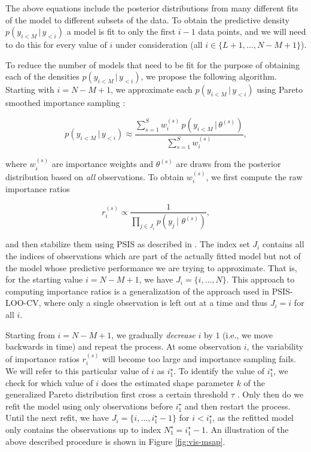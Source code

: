 \documentclass[american,]{article}
\begin{document}
The above equations include the posterior distributions from many
different fits of the model to different subsets of the data. To obtain
the predictive density \(p(y_{i<M} \,|\, y_{<i})\) a model is fit to
only the first \(i-1\) data points, and we will need to do this for every value of
\(i\) under consideration (all \(i \in \{L + 1, \ldots, N - M + 1\}\)).

To reduce the number of models that need to be fit for the purpose of obtaining
each of the densities \(p(y_{i<M} \,|\, y_{<i})\), we propose the following
algorithm. Starting with \(i = N - M + 1\), we approximate each
\(p(y_{i<M} \,|\, y_{<i})\) using Pareto smoothed importance sampling \citep[PSIS;][]{vehtari2017loo, vehtari2017psis}:

\begin{equation}
 p(y_{i<M} \,|\, y_{<i}) \approx
   \frac{ \sum_{s=1}^S w_i^{(s)}\, p(y_{i<M} \,|\, \theta^{(s)})}{ \sum_{s=1}^S w_i^{(s)}},
\end{equation}

where \(w_i^{(s)}\) are importance weights and \(\theta^{(s)}\) are draws from the
posterior distribution based on \emph{all} observations. To obtain \(w_i^{(s)}\), we
first compute the raw importance ratios

\begin{equation}
r_i^{(s)} \propto \frac{1}{\prod_{j \in J_i} p(y_j \,|\, \,\theta^{(s)})},
\end{equation}

and then stabilize them using PSIS as described in \citet{vehtari2017psis}. The index
set \(J_i\) contains all the indices of observations which are part of the actually
fitted model but not of the model whose predictive performance we are trying to
approximate. That is, for the starting value \(i = N - M + 1\), we have
\(J_i = \{i, \ldots, N\}\). This approach to computing importance ratios is a
generalization of the approach used in PSIS-LOO-CV, where only a single observation
is left out at a time and thus \(J_i = i\) for all \(i\).

Starting from \(i = N - M + 1\), we gradually \emph{decrease} \(i\) by \(1\) (i.e., we move
backwards in time) and repeat the process. At some observation \(i\), the
variability of importance ratios \(r_i^{(s)}\) will become too large and
importance sampling fails. We will refer to this particular value of \(i\) as
\(i^\star_1\). To identify the value of \(i^\star_1\), we check for which value of
\(i\) does the estimated shape parameter \(k\) of the generalized Pareto
distribution first cross a certain threshold \(\tau\) \citep{vehtari2017psis}. Only
then do we refit the model using only observations before \(i^\star_1\) and then
restart the process. Until the next refit, we have \(J_i = \{i, \ldots, i^\star_1 -1 \}\) for \(i < i^\star_1\), as the refitted model only contains the observations
up to index \(N^\star_1 = i^\star_1 - 1\). An illustration of the above described procedure is shown in Figure \ref{fig:vis-msap}.
\end{document}
